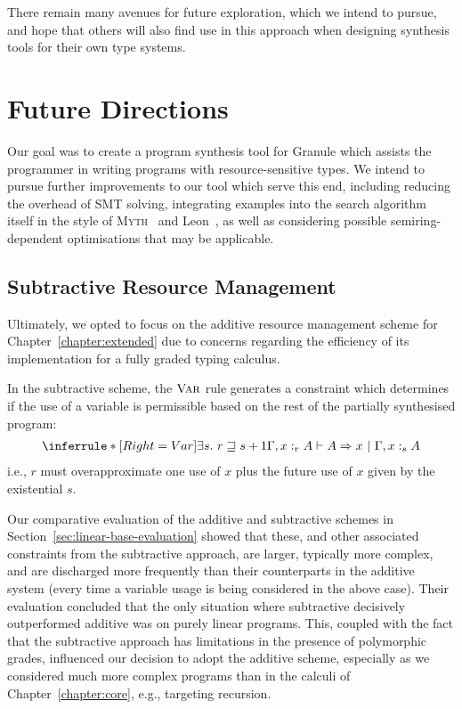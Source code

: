 There remain many avenues for future exploration, which we intend to pursue, and
hope that others will also find use in this approach when designing synthesis
tools for their own type systems. 

\section{Future Directions}
\label{section:future}

Our goal was to create a program synthesis tool for Granule which assists the
programmer in writing programs with resource-sensitive types. We intend to
pursue further improvements to our tool which serve this end, including reducing
the overhead of SMT solving, integrating examples into the search algorithm
itself in the style of \textsc{Myth}~\citep{oseraMYTH1} and
Leon~\citep{10.1145/2509136.2509555}, as well as considering possible
semiring-dependent optimisations that may be applicable.

\subsection{Subtractive Resource Management}
Ultimately, we opted to focus on the additive resource management scheme for
Chapter~\ref{chapter:extended} due to concerns regarding the efficiency of its
implementation for a fully graded typing calculus.

In the subtractive scheme, the $\textsc{Var}$ rule generates a constraint which
determines if the use of a variable is permissible based on the rest of the
partially synthesised program:
\begin{align*}
  \inferrule*[Right=Var]
  {\exists s .\ r \sqsupseteq s + 1}
  {\Gamma, x :_{r} A \vdash A \Rightarrow x\ |\ \Gamma, x :_{s} A}
\end{align*}
i.e., $r$ must overapproximate one use of $x$ plus the future use of
$x$ given by the existential $s$.

Our comparative evaluation of the additive and subtractive schemes in
Section~\ref{sec:linear-base-evaluation} showed that these, and other associated
constraints from the subtractive approach, are larger, typically more complex,
and are discharged more frequently than their counterparts in the additive
system (every time a variable usage is being considered in the above case).
Their evaluation concluded that the only situation where subtractive decisively
outperformed additive was on purely linear programs. This, coupled with the fact
that the subtractive approach has limitations in the presence of polymorphic
grades, influenced our decision to adopt the additive scheme, especially as we
considered much more complex programs than in the calculi of
Chapter~\ref{chapter:core}, e.g., targeting recursion.



